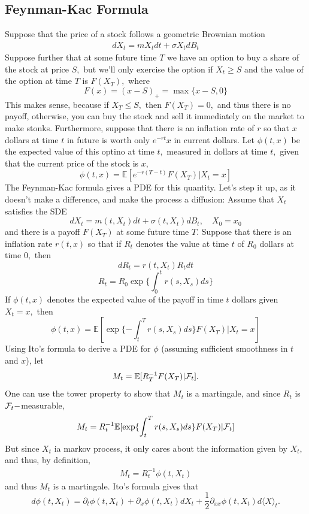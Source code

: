 \documentclass[oneside]{book}
\newcommand{\bbE}{\mathbb{E}}
\begin{document}
\subsection{Feynman-Kac Formula}
Suppose that the price of a stock follows a geometric Brownian motion
\begin{align}
    dX_t = mX_tdt + \sigma X_t dB_t
\end{align}
Suppose further that at some future time $T$ we have an option to buy a share of the stock at price $S,$ but we'll only exercise the option if $X_t \geq S$ and the value of the option at time $T$ is $F(X_T),$ where
\[F(x) = (x-S)_+ = \max\{x-S, 0\}\]
This makes sense, because if $X_T\leq S,$ then $F(X_T) = 0,$ and thus there is no payoff, otherwise, you can buy the stock and sell it immediately on the market to make stonks.\newline\newline
Furthermore, suppose that there is an inflation rate of $r$ so that $x$ dollars at time $t$ in future is worth only $e^{-rt}x$ in current dollars. Let $\phi(t,x)$ be the expected value of this optino at time $t,$ measured in dollars at time $t,$ given that the current price of the stock is $x,$
\[\phi(t,x) = \bbE[e^{-r(T-t)}F(X_T) | X_t = x]\]
The Feynman-Kac formula gives a PDE for this quantity.
\newline\newline
Let's step it up, as it doesn't make a difference, and make the process a diffusion: Assume that $X_t$ satisfies the SDE
\[dX_t = m(t,X_t)dt + \sigma(t,X_t)dB_t, \quad X_0 = x_0\] and there is a payoff $F(X_T)$ at some future time $T.$ Suppose that there is an inflation rate $r(t,x)$ so that if $R_t$ denotes the value at time $t$ of $R_0$ dollars at time $0,$ then 
\[dR_t = r(t,X_t)R_tdt\]
\[R_t = R_0 \exp\{\int_0^t r(s,X_s)ds\}\] If $\phi(t,x)$ denotes the expected value of the payoff in time $t$ dollars given $X_t = x,$ then 
\[\phi(t,x) = \bbE\left[\exp\{-\int_t^T r(s,X_s)ds\} F(X_T) | X_t =x\right]\]
Using Ito's formula to derive a PDE for $\phi$ (assuming sufficient smoothness in $t$ and $x$), let 
\[M_t = \bbE[R_T^{-1}F(X_T) | \calF_t].\]
One can use the tower property to show that $M_t$ is a martingale, and since $R_t$ is $\mathcal{F}_t-$measurable, 
\[M_t = R_t^{-1} \bbE[\exp\{\int_t^T r(s,X_s)ds\} F(X_T) | \calF_t]\]
But since $X_t$ ia markov process, it only cares about the information given by $X_t,$ and thus, by definition,
\begin{align}
    M_t = R_{t}^{-1}\phi(t,X_t)
\end{align}
and thus $M_t$ is a martingale. Ito's formula gives that
\[d\phi(t,X_t) = \partial_t \phi(t,X_t)  + \partial_x\phi(t,X_t)dX_t + \frac{1}{2}\partial_{xx}\phi(t,X_t)d\langle X\rangle_t.\]
\end{document}
